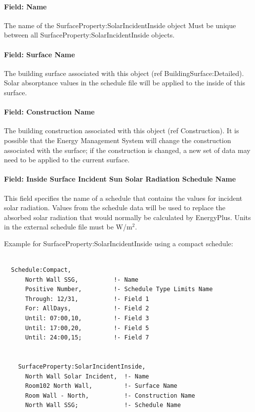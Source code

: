 \paragraph{Field: Name}\label{field-name-10}

The name of the SurfaceProperty:SolarIncidentInside object Must be unique between all SurfaceProperty:SolarIncidentInside objects.

\paragraph{Field: Surface Name}\label{field-surface-name-4}

The building surface associated with this object (ref BuildingSurface:Detailed). Solar absorptance values in the schedule file will be applied to the inside of this surface.

\paragraph{Field: Construction Name}\label{field-construction-name-1}

The building construction associated with this object (ref Construction). It is possible that the Energy Management System will change the construction associated with the surface; if the construction is changed, a new set of data may need to be applied to the current surface.

\paragraph{Field: Inside Surface Incident Sun Solar Radiation Schedule Name}\label{field-inside-surface-incident-sun-solar-radiation-schedule-name}

This field specifies the name of a schedule that contains the values for incident solar radiation. Values from the schedule data will be used to replace the absorbed solar radiation that would normally be calculated by EnergyPlus. Units in the external schedule file must be W/m\(^{2}\).

Example for SurfaceProperty:SolarIncidentInside using a compact schedule:

\begin{lstlisting}

  Schedule:Compact,
      North Wall SSG,          !- Name
      Positive Number,         !- Schedule Type Limits Name
      Through: 12/31,          !- Field 1
      For: AllDays,            !- Field 2
      Until: 07:00,10,         !- Field 3
      Until: 17:00,20,         !- Field 5
      Until: 24:00,15;         !- Field 7


    SurfaceProperty:SolarIncidentInside,
      North Wall Solar Incident,  !- Name
      Room102 North Wall,         !- Surface Name
      Room Wall - North,          !- Construction Name
      North Wall SSG;             !- Schedule Name
\end{lstlisting}

